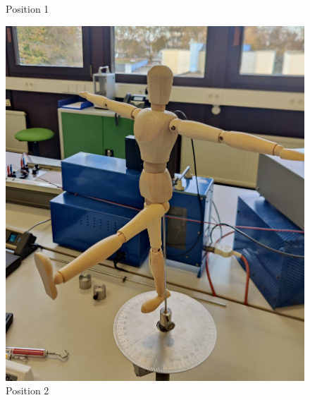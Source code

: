 \begin{figure}[h]
\begin{minipage}{0.45\textwidth}
        \caption{Position 1}
        \label{fig:pos1}
    \end{minipage}
    \hfill
    \begin{minipage}{0.45\textwidth}
        \centering
        \includegraphics[width=\textwidth]{Bilder/abb4.jpg}
        \caption{Position 2}
        \label{fig:pos2}
    \end{minipage}
\end{figure}